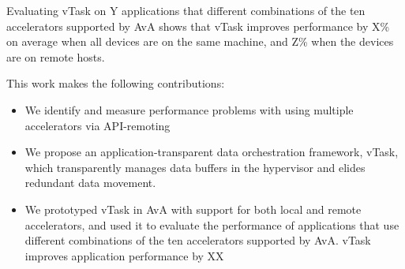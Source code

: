 Evaluating vTask on Y applications that different combinations of the ten accelerators supported by AvA shows that vTask improves performance by X\% on average when all devices are on the same machine, and Z\% when the devices are on remote hosts.

This work makes the following contributions:
\begin{itemize}[nosep,leftmargin=1em,labelwidth=*,align=left]
\item We identify and measure performance problems with using multiple accelerators via API-remoting
\item We propose an application-transparent data orchestration framework, vTask, which transparently manages data buffers in the hypervisor and elides redundant data movement.
\item We prototyped vTask in AvA with support for both local and remote accelerators, and used it to evaluate the performance of applications that use different combinations of the ten accelerators supported by AvA. vTask improves application performance by XX%
\end{itemize}
